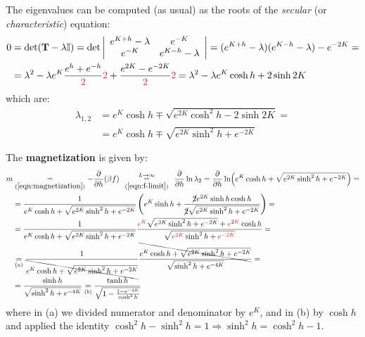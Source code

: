 \documentclass[../../main.tex]{subfiles}
\begin{document}
The eigenvalues can be computed (as usual) as the roots of the \textit{secular} (or \textit{characteristic}) equation:
\begin{align*}
    0 &= \operatorname{det}(\textbf{T} - \lambda \bb{I}) = \operatorname{det} \left|\begin{array}{cc}
    e^{K+h}-\lambda & e^{-K} \\ 
    e^{-K} & e^{K-h}-\lambda
    \end{array}\right| = (e^{K+h} -\lambda)(e^{K-h}-\lambda) - e^{-2K} =\\
    &= \lambda^2 -\lambda e^{K} \frac{e^h + e^{-h}}{\textcolor{Red}{2}}\textcolor{Red}{2} + \frac{e^{2K} - e^{-2K}}{\textcolor{Red}{2}}\textcolor{Red}{2} = \lambda^2 - \lambda e^K \cosh h + 2 \sinh 2K 
\end{align*} 
which are:
\begin{align*}
    \lambda_{1,2} &= e^K \cosh h \mp \sqrt{e^{2K} \cosh^2 h - 2 \sinh 2K} =\\
    &= e^K \cosh h \mp \sqrt{e^{2K} \sinh^2 h + e^{-2K}}
\end{align*}

The \textbf{magnetization} is given by:
\begin{align}\nonumber
    m &\underset{(\ref{eqn:magnetization})}{=}  -\pdv{h} (\beta f) \>\>\overset{\mathclap{L \to \infty}}{\underset{(\ref{eqn:f-limit})}{=}} \>\> \pdv{h} \ln \lambda_2 = \pdv{h} \ln (e^{K} \cosh h + \sqrt{e^{2K} \sinh^2 h + e^{-2K}}) =\\ \nonumber
    &= \frac{1}{e^{K} \cosh h + \sqrt{e^{2K} \sinh^2 h + e^{-2K}}} \left(e^{K} \sinh h + \frac{\cancel{2} e^{2K} \sinh h \cosh h}{\cancel{2} \sqrt{e^{2K} \sinh^2 h + e^{-2K}}} \right) =\\ \nonumber
    &= \frac{1}{e^{K} \cosh h + \sqrt{e^{2K} \sinh^2 h + e^{-2K}}} \frac{\textcolor{Red}{e^K} \sqrt{e^{2K} \sinh^2 h + e^{-2K}} + \textcolor{Red}{e}^{2\textcolor{Red}{K}} \cosh h}{\sqrt{\textcolor{Red}{e^{2K}} \sinh^2 h + \textcolor{Red}{e^{-2K}}}} =\\ \nonumber
    &\underset{(a)}{=}  \frac{1}{\bcancel{e^{K} \cosh h + \sqrt{e^{2K} \sinh^2 h + e^{-2K}}}} \frac{\bcancel{e^K \cosh h + \sqrt{e^{2K} \sinh^2 h + e^{-2K}}}}{\sqrt{\sinh^2 h + e^{-4K}}} =\\
    &=  \frac{\sinh h}{\sqrt{\sinh^2 h + e^{-4K}}} \underset{(b)}{=} \frac{\tanh h}{\sqrt{1 - \frac{1-e^{-4K}}{\cosh^2 h} }} \label{eqn:m-pbc}
\end{align}
where in (a) we divided numerator and denominator by $e^K$, and in (b) by $\cosh h$ and applied the identity $\cosh^2 h - \sinh^2 h = 1 \Rightarrow \sinh^2 h = \cosh^2 h - 1$. 
\end{document}
